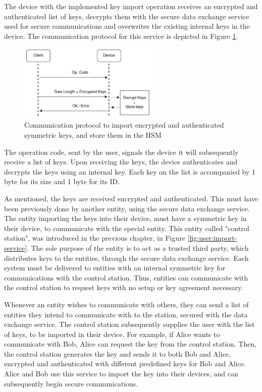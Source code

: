 The device with the implemented key import operation receives an encrypted and authenticated list of keys, decrypts them with the secure data exchange service used for secure communications and overwrites the existing internal keys in the device.
The communication protocol for this service is depicted in Figure \ref{fig:protocol:import-keys}.
\begin{figure}[h!]
	\centering
	\includegraphics[width=0.60\textwidth]{./Images/import-keys.png}
	\caption{Communication protocol to import encrypted and authenticated symmetric keys, and store them in the HSM}
	\label{fig:protocol:import-keys}
\end{figure}

The operation code, sent by the user, signals the device it will subsequently receive a list of keys. Upon receiving the keys, the device authenticates and decrypts the keys using an internal key.
Each key on the list is accompanied by 1 byte for its size and 1 byte for its ID.

As mentioned, the keys are received encrypted and authenticated. This must have been previously done by another entity, using the secure data exchange service.
The entity importing the keys into their device, must have a symmetric key in their device, to communicate with the special entity. This entity called "control station", was introduced in the previous chapter, in Figure \ref{fig:user:import-service}.
The sole purpose of the entity is to act as a trusted third party, which distributes keys to the entities, through the secure data exchange service.
Each system must be delivered to entities with an internal symmetric key for communications with the control station. Thus, entities can communicate with the control station to request keys with no setup or key agreement necessary.

Whenever an entity wishes to communicate with others, they can send a list of entities they intend to communicate with to the station, secured with the data exchange service. The control station subsequently supplies the user with the list of keys, to be imported in their device.
For example, if Alice wants to communicate with Bob, Alice can request the key from the control station. Then, the control station generates the key and sends it to both Bob and Alice, encrypted and authenticated with different predefined keys for Bob and Alice.
Alice and Bob use this service to import the key into their devices, and can subsequently begin secure communications.

